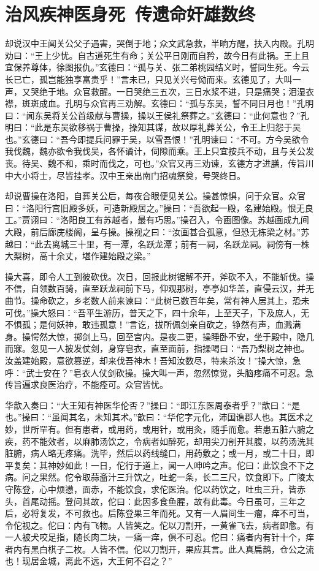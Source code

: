 \chapter{治风疾神医身死~传遗命奸雄数终}

却说汉中王闻关公父子遇害，哭倒于地；众文武急救，半晌方醒，扶入内殿。孔明劝曰：“王上少忧。自古道死生有命；关公平日刚而自矜，故今日有此祸。王上且宜保养尊体，徐图报仇。”玄德曰：“孤与关、张二弟桃园结义时，誓同生死。今云长已亡，孤岂能独享富贵乎！”言未已，只见关兴号恸而来。玄德见了，大叫一声，又哭绝于地。众官救醒。一日哭绝三五次，三日水浆不进，只是痛哭；泪湿衣襟，斑斑成血。孔明与众官再三劝解。玄德曰：“孤与东吴，誓不同日月也！”孔明曰：“闻东吴将关公首级献与曹操，操以王侯礼祭葬之。”玄德曰：“此何意也？”孔明曰：“此是东吴欲移祸于曹操，操知其谋，故以厚礼葬关公，令王上归怨于吴也。”玄德曰：“吾今即提兵问罪于吴，以雪吾恨！”孔明谏曰：“不可。方今吴欲令我伐魏，魏亦欲令我伐吴，各怀谲计，伺隙而乘。王上只宜按兵不动，且与关公发丧。待吴、魏不和，乘时而伐之，可也。”众官又再三劝谏，玄德方才进膳，传旨川中大小将士，尽皆挂孝。汉中王亲出南门招魂祭奠，号哭终日。

却说曹操在洛阳，自葬关公后，每夜合眼便见关公。操甚惊惧，问于众官。众官曰：“洛阳行宫旧殿多妖，可造新殿居之。”操曰：“吾欲起一殿，名建始殿。恨无良工。”贾诩曰：“洛阳良工有苏越者，最有巧思。”操召入，令画图像。苏越画成九间大殿，前后廊庑楼阁，呈与操。操视之曰：“汝画甚合孤意，但恐无栋梁之材。”苏越曰：“此去离城三十里，有一潭，名跃龙潭；前有一祠，名跃龙祠。祠傍有一株大梨树，高十余丈，堪作建始殿之梁。”

操大喜，即令人工到彼砍伐。次日，回报此树锯解不开，斧砍不入，不能斩伐。操不信，自领数百骑，直至跃龙祠前下马，仰观那树，亭亭如华盖，直侵云汉，并无曲节。操命砍之，乡老数人前来谏曰：“此树已数百年矣，常有神人居其上，恐未可伐。”操大怒曰：“吾平生游历，普天之下，四十余年，上至天子，下及庶人，无不惧孤；是何妖神，敢违孤意！”言讫，拔所佩剑亲自砍之，铮然有声，血溅满身。操愕然大惊，掷剑上马，回至宫内。是夜二更，操睡卧不安，坐于殿中，隐几而寐。忽见一人披发仗剑，身穿皂衣，直至面前，指操喝曰：“吾乃梨树之神也。汝盖建始殿，意欲篡逆，却来伐吾神木！吾知汝数尽，特来杀汝！”操大惊，急呼：“武士安在？”皂衣人仗剑砍操。操大叫一声，忽然惊觉，头脑疼痛不可忍。急传旨遍求良医治疗，不能痊可。众官皆忧。

华歆入奏曰：“大王知有神医华伦否？”操曰：“即江东医周泰者乎？”歆曰：“是也。”操曰：“虽闻其名，未知其术。”歆曰：“华佗字元化，沛国谯郡人也。其医术之妙，世所罕有。但有患者，或用药，或用针，或用灸，随手而愈。若患五脏六腑之疾，药不能效者，以麻肺汤饮之，令病者如醉死，却用尖刀剖开其腹，以药汤洗其脏腑，病人略无疼痛。洗毕，然后以药线缝口，用药敷之；或一月，或二十日，即平复矣：其神妙如此！一日，佗行于道上，闻一人呻吟之声。佗曰：此饮食不下之病。问之果然。佗令取蒜齑汁三升饮之，吐蛇一条，长二三尺，饮食即下。广陵太守陈登，心中烦懑，面赤，不能饮食，求佗医治。佗以药饮之，吐虫三升，皆赤头，首尾动摇。登问其故，佗曰：此因多食鱼腥，故有此毒。今日虽可，三年之后，必将复发，不可救也。后陈登果三年而死。又有一人眉间生一瘤，痒不可当，令佗视之。佗曰：内有飞物。人皆笑之。佗以刀割开，一黄雀飞去，病者即愈。有一人被犬咬足指，随长肉二块，一痛一痒，俱不可忍。佗曰：痛者内有针十个，痒者内有黑白棋子二枚。人皆不信。佗以刀割开，果应其言。此人真扁鹊，仓公之流也！现居金城，离此不远，大王何不召之？”

